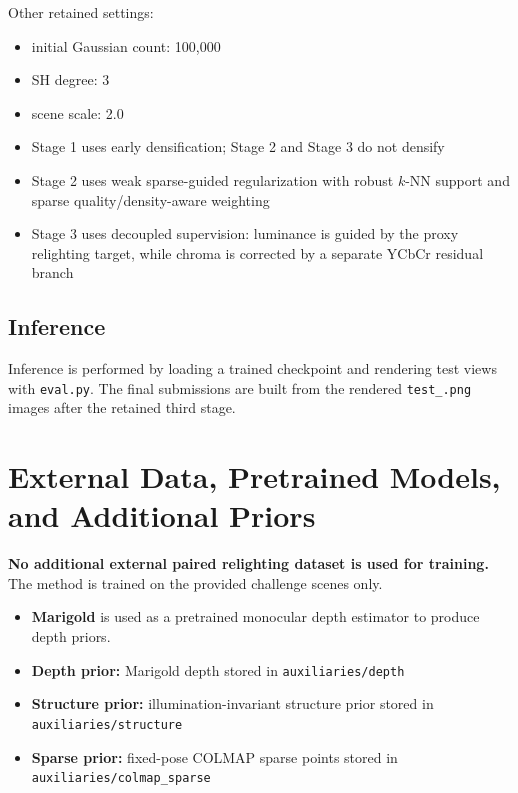 \documentclass[10pt,a4paper]{article}
\begin{document}
Other retained settings:
\begin{itemize}[leftmargin=2em]
  \item initial Gaussian count: 100{,}000
  \item SH degree: 3
  \item scene scale: 2.0
  \item Stage 1 uses early densification; Stage 2 and Stage 3 do not densify
  \item Stage 2 uses weak sparse-guided regularization with robust $k$-NN support and sparse quality/density-aware weighting
  \item Stage 3 uses decoupled supervision: luminance is guided by the proxy relighting target, while chroma is corrected by a separate YCbCr residual branch
\end{itemize}

\subsection{Inference}
Inference is performed by loading a trained checkpoint and rendering test views with \texttt{eval.py}. The final submissions are built from the rendered \texttt{test\_\*.png} images after the retained third stage.

\section{External Data, Pretrained Models, and Additional Priors}
\textbf{No additional external paired relighting dataset is used for training.} The method is trained on the provided challenge scenes only.

\begin{itemize}[leftmargin=2em]
  \item \textbf{Marigold} is used as a pretrained monocular depth estimator to produce depth priors.
  \item \textbf{Depth prior:} Marigold depth stored in \texttt{auxiliaries/depth}
  \item \textbf{Structure prior:} illumination-invariant structure prior stored in \texttt{auxiliaries/structure}
  \item \textbf{Sparse prior:} fixed-pose COLMAP sparse points stored in \texttt{auxiliaries/colmap\_sparse}
\end{itemize}
\end{document}
